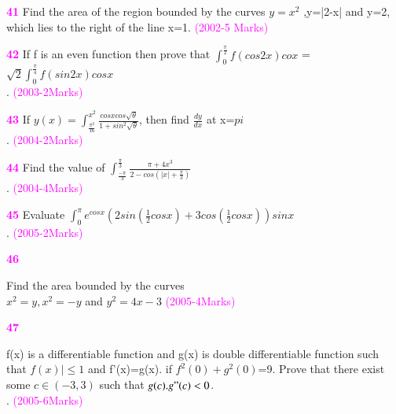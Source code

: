 \documentclass[journal,12pt,twocolumn]{IEEEtran}
\theoremstyle{remark}
\begin{document}
													      \textbf{\textcolor{magenta}{41}}
													        Find the area of the region bounded by the curves $y=x^2$ ,y=|2-x| and y=2, which lies to the right of the line x=1.
														  \hfill{\textcolor{magenta}{(2002-5 Marks) }}

														    \textbf{\textcolor{magenta}{42}}
														      If f is an even function then prove that 
														        $\int_{0}^{\frac{\pi}{2}}f(cos2x)cox $ =$\sqrt{2}\int_{0}^{\frac{\pi}{4}}f(sin2x)cosx$\\.
															  \hfill{\textcolor{magenta}{(2003-2Marks)}}
															    
															       \textbf{\textcolor{magenta}{43}}
															          If $y(x)=\int_{\frac{\pi^2}{16}}^{x^2}\frac{cosxcos\sqrt{\theta}}{1+sin^2\sqrt{\theta}}$, then find $\frac{dy}{dx}$ at x=$pi$\\.
																     \hfill{\textcolor{magenta}{(2004-2Marks)}}

																        \textbf{\textcolor{magenta}{44}}
																	   Find the value of $\int_{\frac{-\pi}{3}}^{\frac{\pi}{3}}\frac{\pi+4x^3}{2-cos(|x|+\frac{\pi}{3})}$\\.
																	      \hfill{\textcolor{magenta}{(2004-4Marks)}}

																	         \textbf{\textcolor{magenta}{45}}
																		    Evaluate $\int_{0}^{\pi}e^{cosx}(2sin(\frac{1}{2}cosx)+3cos(\frac{1}{2}cosx))sinx$\\.
																		       \hfill{\textcolor{magenta}{(2005-2Marks)}}

																		          \textbf{\textcolor{magenta}{46}}
																			     
																			        Find the area bounded by the curves \\  
																				   $x^2=y,x^2=-y$ and $y^2=4x-3$
																				      \hfill{\textcolor{magenta}{(2005-4Marks)}}
																				         
																					    \textbf{\textcolor{magenta}{47}}
																					       
																					          f(x) is a differentiable function and g(x) is  double differentiable function such that $f(x)|\le1$ and f'(x)=g(x). if $f^2(0)+g^2(0)$=9. Prove that there exist some $c\in(-3,3)$ such that $g(c).g"(c)<0$.\\.
																						     \hfill{\textcolor{magenta}{(2005-6Marks)}}
\end{document}
